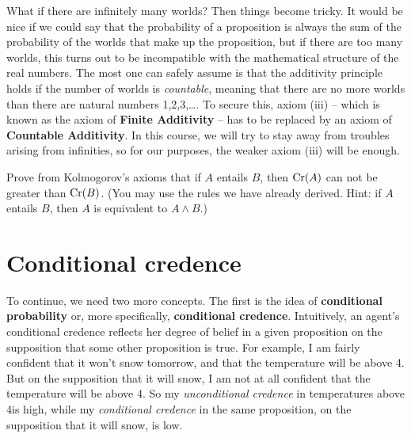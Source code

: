 What if there are infinitely many worlds? Then things become tricky.
It would be nice if we could say that the probability of a proposition
is always the sum of the probability of the worlds that make up the
proposition, but if there are too many worlds, this turns out to be
incompatible with the mathematical structure of the real numbers. The
most one can safely assume is that the additivity principle holds if
the number of worlds is \emph{countable}, meaning that there are no
more worlds than there are natural numbers 1,2,3,\ldots. To secure
this, axiom (iii) -- which is known as the axiom of \textbf{Finite
  Additivity} -- has to be replaced by an axiom of \textbf{Countable
  Additivity}. 
%
%
In this course, we will try to stay away from troubles arising from
infinities, so for our purposes, the weaker axiom (iii) will be enough.

\begin{exercise3}
  Prove from Kolmogorov's axioms that if $A$ entails $B$, then
  $\text{Cr}(A)$ can not be greater than $\text{Cr}(B)$. (You may use the rules we
  have already derived. Hint: if $A$ entails $B$, then $A$ is
  equivalent to $A \land B$.)
\end{exercise3}


\section{Conditional credence}\label{sec:conditional}

To continue, we need two more concepts. The first is the idea of
\textbf{conditional probability} or, more specifically,
\textbf{conditional credence}.  Intuitively, an agent's conditional
credence reflects her degree of belief in a given proposition on the
supposition that some other proposition is true. For example, I am
fairly confident that it won't snow tomorrow, and that the temperature
will be above 4\celsius. But on the supposition that it will snow, I
am not at all confident that the temperature will be above
4\celsius. So my \emph{unconditional credence} in temperatures above
4\celsius is high, while my \emph{conditional credence} in the same
proposition, on the supposition that it will snow, is low.

